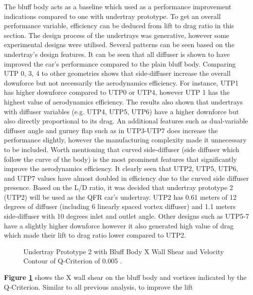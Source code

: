 \noindent The bluff body acts as a baseline which used as a performance improvement indications compared to one with undertray prototype. To get an overall performance variable, efficiency can be deduced from lift to drag ratio in this section. The design process of the undertrays was generative, however some experimental designs were utilised. Several patterns can be seen based on the undertray's design features. It can be seen that all diffuser is shown to have improved the car's performance compared to the plain bluff body. Comparing UTP 0, 3, 4 to other geometries shows that side-diffuser increase the overall downforce but not necessarily the aerodynamics efficiency. For instance, UTP1 has higher downforce compared to UTP0 or UTP4, however UTP 1 has the highest value of aerodynamics efficiency. The results also shown that undertrays with diffuser variables (e.g. UTP4, UTP5, UTP6) have a higher downforce but also directly proportional to its drag. An additional features such as dual-variable diffuser angle and gurney flap such as in UTP3-UTP7 does increase the performance slightly, however the manufacturing complexity made it unnecessary to be included.  Worth mentioning that curved side-diffuser (side diffuser which follow the curve of the body) is the most prominent features that significantly improve the aerodynamics efficiency. It clearly seen that UTP2, UTP5, UTP6, and UTP7 values have almost doubled in efficiency due to the curved side diffuser presence. Based on the L/D ratio, it was decided that undertray prototype 2 (UTP2) will be used as the QFR car's undertray. UTP2 has 0.61 meters of 12 degrees of diffuser (including 6 linearly spaced vortex diffuser) and 1.1 meters side-diffuser with 10 degrees inlet and outlet angle. Other designs such as UTP5-7  have a slightly higher downforce however it also generated high value of drag which made their lift to drag ratio lower compared to UTP2. 

\begin{figure}[!htb] 
    \centering
    \noindent{}
    \caption{Undertray Prototype 2 with Bluff Body X Wall Shear and Velocity Contour of Q-Criterion of 0.005 .}
      \label{fig:3D_QCRIT_WSHEAR_UTP2}
\end{figure}

\textbf{Figure \ref{fig:3D_QCRIT_WSHEAR_UTP2}} shows the X wall shear on the bluff body and vortices indicated by the Q-Criterion. Similar to all previous analysis, to improve the lift 
















